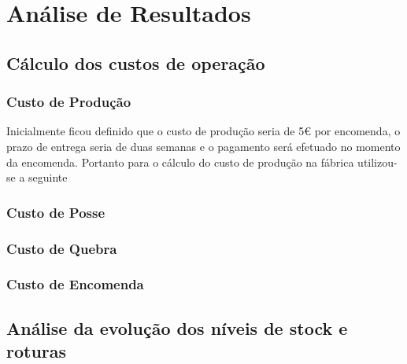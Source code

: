 \chapter{Análise de Resultados}
\section{Cálculo dos custos de operação}

\subsection{Custo de Produção}
Inicialmente ficou definido que o custo de produção seria de 5\euro{}  por encomenda, o prazo de entrega seria de duas semanas e o pagamento será efetuado no momento da encomenda. Portanto para o cálculo do custo de produção na fábrica utilizou-se a seguinte 

\subsection{Custo de Posse}



\subsection{Custo de Quebra}

\subsection{Custo de Encomenda}


\section{Análise da evolução dos níveis de stock e roturas}

